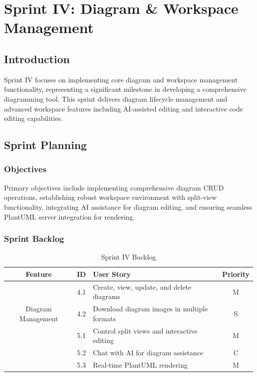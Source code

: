 \chapter[Sprint IV]{Sprint IV: Diagram \& Workspace Management}

\section{Introduction}
Sprint IV focuses on implementing core diagram and workspace management functionality, representing a significant milestone in developing a comprehensive diagramming tool. This sprint delivers diagram lifecycle management and advanced workspace features including AI-assisted editing and interactive code editing capabilities.

\section{Sprint Planning}

\subsection{Objectives}
Primary objectives include implementing comprehensive diagram CRUD operations, establishing robust workspace environment with split-view functionality, integrating AI assistance for diagram editing, and ensuring seamless PlantUML server integration for rendering.

\subsection{Sprint Backlog}
\begin{table}[H]
    \centering
    \caption{Sprint IV Backlog}
    \begin{tabularx}{\textwidth}{|c|c|X|c|}
    \hline
    \textbf{Feature} & \textbf{ID} & \textbf{User Story} & \textbf{Priority} \\
    \hline
    \multirow{3}{*}{Diagram Management} & 4.1 & Create, view, update, and delete diagrams & M \\
    \cline{2-4}
    & 4.2 & Download diagram images in multiple formats & S \\
    \hline
    \multirow{3}{*}{Workspace Management} & 5.1 & Control split views and interactive editing & M \\
    \cline{2-4}
    & 5.2 & Chat with AI for diagram assistance & C \\
    \cline{2-4}
    & 5.3 & Real-time PlantUML rendering & M \\
    \hline
    \end{tabularx}
\end{table}

